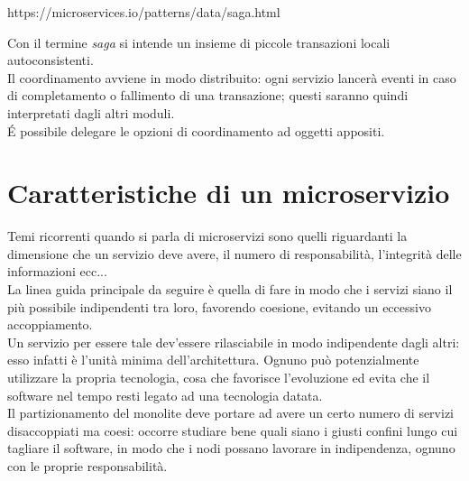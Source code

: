 https://microservices.io/patterns/data/saga.html

Con il termine \textit{saga} si intende un insieme di piccole transazioni locali autoconsistenti.\\
Il coordinamento avviene in modo distribuito: ogni servizio lancerà eventi in caso di completamento o fallimento di una transazione; questi saranno quindi interpretati dagli altri moduli.\\
\'E possibile delegare le opzioni di coordinamento ad oggetti appositi.

\section{Caratteristiche di un microservizio}

Temi ricorrenti quando si parla di microservizi sono quelli riguardanti la dimensione che un servizio deve avere, il numero di responsabilità, l'integrità delle informazioni ecc...\\
La linea guida principale da seguire è quella di fare in modo che i servizi siano il più possibile indipendenti tra loro, favorendo coesione, evitando un eccessivo accoppiamento.\\
Un servizio per essere tale dev'essere rilasciabile in modo indipendente dagli altri: esso infatti è l'unità minima dell'architettura. Ognuno può potenzialmente utilizzare la propria tecnologia, cosa che favorisce l'evoluzione ed evita che il software nel tempo resti legato ad una tecnologia datata.\\
Il partizionamento del monolite deve portare ad avere un certo numero di servizi disaccoppiati ma coesi: occorre studiare bene quali siano i giusti confini lungo cui tagliare il software, in modo che i nodi possano lavorare in indipendenza, ognuno con le proprie responsabilità.